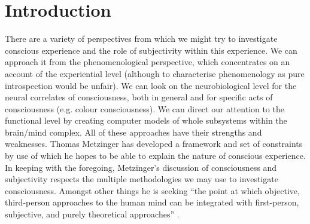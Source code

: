 

% 

\chapter{Introduction}
\label{chap:intro}

There are a variety of perspectives from which we might try to investigate conscious experience and the role of subjectivity within this experience. We can approach it from the phenomenological perspective, which concentrates on an account of the experiential level (although to characterise phenomenology as pure introspection would be unfair). We can look on the neurobiological level for the neural correlates of consciousness, both in general and for specific acts of consciousness (e.g. colour consciousness). We can direct our attention to the functional level by creating computer models of whole subsystems within the brain/mind complex. All of these approaches have their strengths and weaknesses. Thomas Metzinger has developed a framework and set of constraints by use of which he hopes to be able to explain the nature of conscious experience. In keeping with the foregoing, Metzinger’s discussion of consciousness and subjectivity respects the multiple methodologies we may use to investigate consciousness. Amongst other things he is seeking “the point at which objective, third-person approaches to the human mind can be integrated with first-person, subjective, and purely theoretical approaches” \cite{metzinger2003}.

